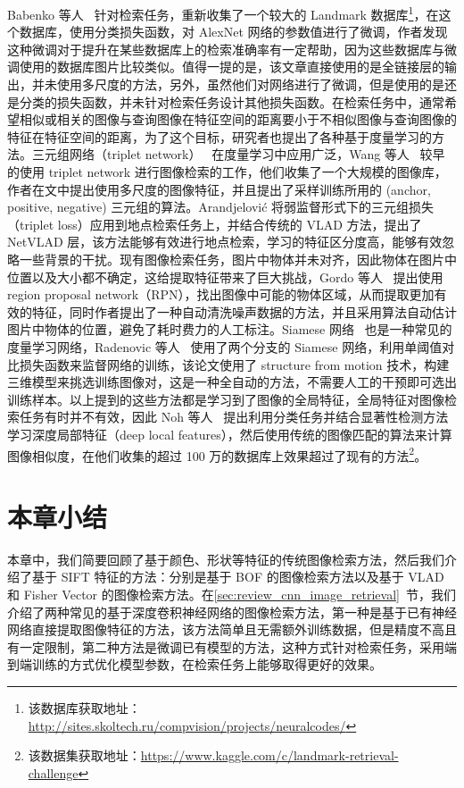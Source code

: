 Babenko 等人~\cite{Babenko2014NeuralCF} 针对检索任务，重新收集了一个较大的 Landmark 数据库\footnote{该数据库获取地址：\url{http://sites.skoltech.ru/compvision/projects/neuralcodes/}}，在这个数据库，使用分类损失函数，对 AlexNet 网络的参数值进行了微调，作者发现这种微调对于提升在某些数据库上的检索准确率有一定帮助，因为这些数据库与微调使用的数据库图片比较类似。值得一提的是，该文章直接使用的是全链接层的输出，并未使用多尺度的方法，另外，虽然他们对网络进行了微调，但是使用的是还是分类的损失函数，并未针对检索任务设计其他损失函数。在检索任务中，通常希望相似或相关的图像与查询图像在特征空间的距离要小于不相似图像与查询图像的特征在特征空间的距离，为了这个目标，研究者也提出了各种基于度量学习的方法。三元组网络（triplet network）~\cite{Wang2014LearningFI,Schroff2015FaceNetAU} 在度量学习中应用广泛，Wang 等人~\cite{Wang2014LearningFI} 较早的使用 triplet network 进行图像检索的工作，他们收集了一个大规模的图像库，作者在文中提出使用多尺度的图像特征，并且提出了采样训练所用的 (anchor, positive, negative) 三元组的算法。Arandjelovi{\'c} 将弱监督形式下的三元组损失（triplet loss）应用到地点检索任务上，并结合传统的 VLAD 方法，提出了 NetVLAD 层，该方法能够有效进行地点检索，学习的特征区分度高，能够有效忽略一些背景的干扰。现有图像检索任务，图片中物体并未对齐，因此物体在图片中位置以及大小都不确定，这给提取特征带来了巨大挑战，Gordo 等人~\cite{Gordo2016DeepIR} 提出使用 region proposal network（RPN），找出图像中可能的物体区域，从而提取更加有效的特征，同时作者提出了一种自动清洗噪声数据的方法，并且采用算法自动估计图片中物体的位置，避免了耗时费力的人工标注。Siamese 网络~\cite{Bell2015LearningVS,Hadsell2006DimensionalityRB} 也是一种常见的度量学习网络，Radenovic 等人~\cite{Radenovic2016CNNIR} 使用了两个分支的 Siamese 网络，利用单阈值对比损失函数来监督网络的训练，该论文使用了 structure from motion 技术，构建三维模型来挑选训练图像对，这是一种全自动的方法，不需要人工的干预即可选出训练样本。以上提到的这些方法都是学习到了图像的全局特征，全局特征对图像检索任务有时并不有效，因此 Noh 等人~\cite{Noh2017LargeScaleIR} 提出利用分类任务并结合显著性检测方法学习深度局部特征（deep local features），然后使用传统的图像匹配的算法来计算图像相似度，在他们收集的超过 100 万的数据库上效果超过了现有的方法\footnote{该数据集获取地址：\url{https://www.kaggle.com/c/landmark-retrieval-challenge}}。


\section{本章小结}\label{sec:related_work_conclusion}
本章中，我们简要回顾了基于颜色、形状等特征的传统图像检索方法，然后我们介绍了基于 SIFT 特征的方法：分别是基于 BOF 的图像检索方法以及基于 VLAD 和 Fisher Vector 的图像检索方法。在\ref{sec:review_cnn_image_retrieval}~节，我们介绍了两种常见的基于深度卷积神经网络的图像检索方法，第一种是基于已有神经网络直接提取图像特征的方法，该方法简单且无需额外训练数据，但是精度不高且有一定限制，第二种方法是微调已有模型的方法，这种方式针对检索任务，采用端到端训练的方式优化模型参数，在检索任务上能够取得更好的效果。
